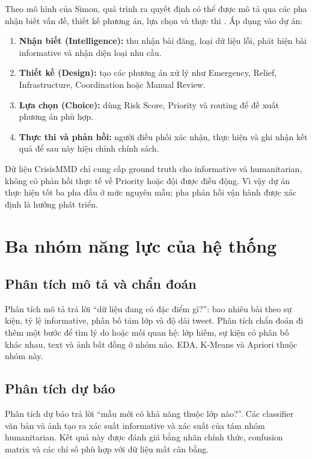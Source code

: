 Theo mô hình của Simon, quá trình ra quyết định có thể được mô tả qua các pha
nhận biết vấn đề, thiết kế phương án, lựa chọn và thực thi
\cite{simon1960}. Áp dụng vào dự án:

\begin{enumerate}[leftmargin=*]
  \item \textbf{Nhận biết (Intelligence):} thu nhận bài đăng, loại dữ liệu lỗi,
        phát hiện bài informative và nhận diện loại nhu cầu.
  \item \textbf{Thiết kế (Design):} tạo các phương án xử lý như Emergency,
        Relief, Infrastructure, Coordination hoặc Manual Review.
  \item \textbf{Lựa chọn (Choice):} dùng Risk Score, Priority và routing để đề
        xuất phương án phù hợp.
  \item \textbf{Thực thi và phản hồi:} người điều phối xác nhận, thực hiện và
        ghi nhận kết quả để sau này hiệu chỉnh chính sách.
\end{enumerate}

Dữ liệu CrisisMMD chỉ cung cấp ground truth cho informative và humanitarian,
không có phản hồi thực tế về Priority hoặc đội được điều động. Vì vậy dự án
thực hiện tốt ba pha đầu ở mức nguyên mẫu; pha phản hồi vận hành được xác định
là hướng phát triển.

\section{Ba nhóm năng lực của hệ thống}

\subsection{Phân tích mô tả và chẩn đoán}

Phân tích mô tả trả lời ``dữ liệu đang có đặc điểm gì?'': bao nhiêu bài theo
sự kiện, tỷ lệ informative, phân bố tám lớp và độ dài tweet. Phân tích chẩn
đoán đi thêm một bước để tìm lý do hoặc mối quan hệ: lớp hiếm, sự kiện có phân
bố khác nhau, text và ảnh bất đồng ở nhóm nào. EDA, K-Means và Apriori thuộc
nhóm này.

\subsection{Phân tích dự báo}

Phân tích dự báo trả lời ``mẫu mới có khả năng thuộc lớp nào?''. Các classifier
văn bản và ảnh tạo ra xác suất informative và xác suất của tám nhóm
humanitarian. Kết quả này được đánh giá bằng nhãn chính thức, confusion matrix
và các chỉ số phù hợp với dữ liệu mất cân bằng.


